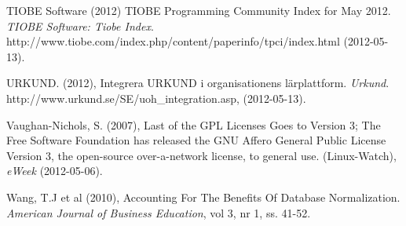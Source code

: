 \begin{flushleft}
TIOBE Software (2012) TIOBE Programming Community Index for May 2012. \emph{TIOBE Software: Tiobe Index}. http://www.tiobe.com/index.php/content/paperinfo/tpci/index.html (2012-05-13).

URKUND. (2012), Integrera URKUND i organisationens lärplattform. \emph{Urkund}. http://www.urkund.se/SE/uoh\_integration.asp, (2012-05-13).

Vaughan-Nichols, S. (2007), Last of the GPL Licenses Goes to Version 3; The Free Software Foundation has released the GNU Affero General Public License Version 3, the open-source over-a-network license, to general use. (Linux-Watch), \emph{eWeek} (2012-05-06).

Wang, T.J et al (2010), Accounting For The Benefits Of Database Normalization. \emph{American Journal of Business Education}, vol 3, nr 1, ss. 41-52.

\normalsize
\end{flushleft}
